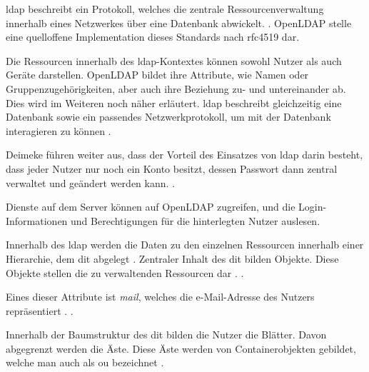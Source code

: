 \ac{ldap} beschreibt  ein Protokoll, welches die zentrale Ressourcenverwaltung innerhalb eines Netzwerkes über eine Datenbank abwickelt.
 \citep[][611]{Deimeke2019}. OpenLDAP stelle eine quelloffene Implementation dieses Standards nach \ac{rfc}4519 dar.

Die Ressourcen innerhalb des \ac{ldap}-Kontextes können sowohl Nutzer als auch Geräte darstellen. OpenLDAP bildet ihre Attribute, wie Namen oder Gruppenzugehörigkeiten, aber auch ihre Beziehung zu- und untereinander ab. Dies wird im Weiteren noch näher erläutert. 
\ac{ldap} beschreibt gleichzeitig eine Datenbank sowie ein passendes Netzwerkprotokoll, um mit der Datenbank interagieren zu können \citep[vgl.][3]{Gietz}.

Deimeke \ua führen weiter aus, dass der Vorteil des Einsatzes von \ac{ldap} darin besteht, dass jeder Nutzer nur noch ein Konto besitzt, dessen Passwort dann zentral verwaltet und geändert werden kann. 
 \citep[][611]{Deimeke2019}.

Dienste auf dem Server können auf OpenLDAP zugreifen, und die Login-Informationen und Berechtigungen für die hinterlegten Nutzer auslesen.

Innerhalb des \ac{ldap} werden die Daten zu den einzelnen Ressourcen innerhalb einer Hierarchie, dem \ac{dit} abgelegt \citep[vgl.][7]{rfc4512}. 
Zentraler Inhalt des \ac{dit} bilden Objekte. Diese Objekte stellen die zu verwaltenden Ressourcen dar \citep[vgl.][614]{Deimeke2019}. 
 \citep[][614]{Deimeke2019}. 

Eines dieser Attribute ist \zb \textit{mail}, welches die e-Mail-Adresse des Nutzers repräsentiert \citep[][18]{rfc4519}.
 \citep[][615]{Deimeke2019}.

Innerhalb der Baumstruktur des \ac{dit} bilden die Nutzer die Blätter. Davon abgegrenzt werden die Äste. Diese  Äste werden von Containerobjekten gebildet, welche man auch als \ac{ou} bezeichnet \citep[vgl.][614]{Deimeke2019}.

